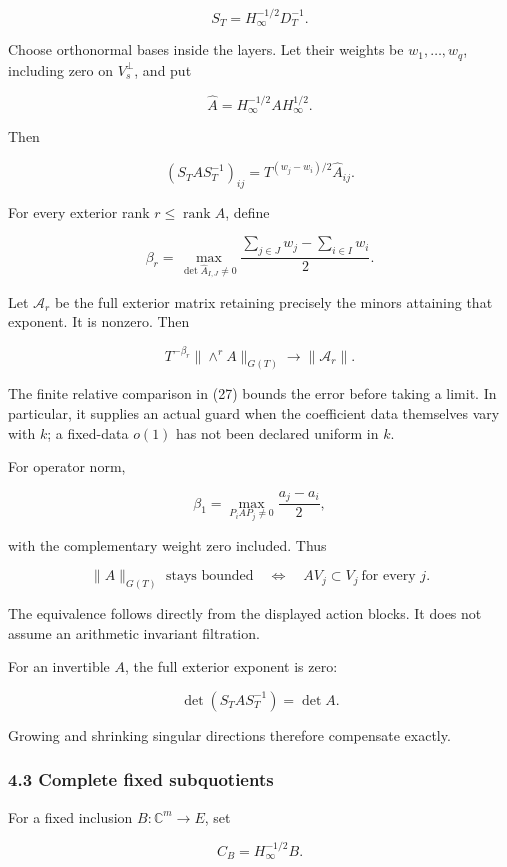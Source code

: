 \documentclass[11pt]{article}
\begin{document}
\[
S_T=H_\infty^{-1/2}D_T^{-1}.
\]

Choose orthonormal bases inside the layers. Let their weights be \(w_1,\ldots,w_q\), including zero on \(V_s^\perp\), and put

\[
\widehat A=H_\infty^{-1/2}AH_\infty^{1/2}.
\]

Then

\[
(S_TAS_T^{-1})_{ij}
=
T^{(w_j-w_i)/2}\widehat A_{ij}.
\]

For every exterior rank \(r\le\operatorname{rank}A\), define

\[
\boxed{
\beta_r=
\max_{\det\widehat A_{I,J}\ne0}
\frac{\sum_{j\in J}w_j-\sum_{i\in I}w_i}{2}.
}
\tag{29}
\]

Let \(\mathcal A_r\) be the full exterior matrix retaining precisely the minors attaining that exponent. It is nonzero. Then

\[
\boxed{
T^{-\beta_r}
\|\wedge^rA\|_{G(T)}
\longrightarrow\|\mathcal A_r\|.
}
\tag{30}
\]

The finite relative comparison in (27) bounds the error before taking a limit. In particular, it supplies an actual guard when the coefficient data themselves vary with \(k\); a fixed-data \(o(1)\) has not been declared uniform in \(k\).

For operator norm,

\[
\beta_1=
\max_{P_iAP_j\ne0}\frac{a_j-a_i}{2},
\]

with the complementary weight zero included. Thus

\[
\boxed{
\|A\|_{G(T)}\text{ stays bounded}
\quad\Longleftrightarrow\quad
A V_j\subset V_j\ \text{for every }j.
}
\tag{31}
\]

The equivalence follows directly from the displayed action blocks. It does not assume an arithmetic invariant filtration.

For an invertible \(A\), the full exterior exponent is zero:

\[
\det(S_TAS_T^{-1})=\det A.
\]

Growing and shrinking singular directions therefore compensate exactly.

\subsubsection{4.3 Complete fixed subquotients}\label{complete-fixed-subquotients}

For a fixed inclusion \(B:\mathbb C^m\to E\), set

\[
C_B=H_\infty^{-1/2}B.
\]
\end{document}
